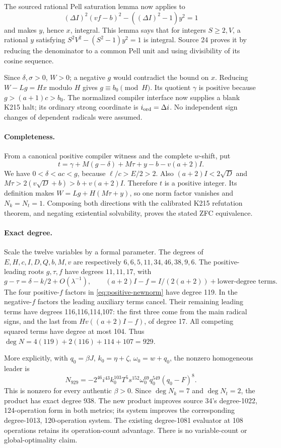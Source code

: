 The sourced rational Pell saturation lemma now applies to
\[
(\Delta I)^2(vf-b)^2-((\Delta I)^2-1)y^2=1
\]
and makes \(y\), hence \(x\), integral. This lemma says that for
integers \(S\ge2,V\), a rational \(y\) satisfying
\(S^2V^2-(S^2-1)y^2=1\) is integral. Source 24 proves it by reducing
the denominator to a common Pell unit and using divisibility of its
cosine sequence.

Since \(\delta,\sigma>0\), \(W>0\); a negative \(g\) would contradict
the bound on \(x\). Reducing \(W-Lg=Hx\) modulo \(H\) gives
\(g\equiv b_0\pmod H\). Its quotient \(\gamma\) is positive because
\(g>(a+1)c>b_0\). The normalized compiler interface now supplies a blank
K215 halt; its ordinary strong coordinate is \(i_{\rm ord}=\Delta i\).
No independent sign changes of dependent radicals were assumed.

\paragraph{Completeness.}
From a canonical positive compiler witness and the complete \(w\)-shift,
put
\[
t=\gamma+M(g-\delta)+M\tau+y-b-v(a+2)I.
\]
We have \(0<\delta<ac<g\), because \(\ell/c>E/2>2\).
Also \((a+2)I<2\sqrt D\) and
\(M\tau>2(v\sqrt D+b)>b+v(a+2)I\). Therefore \(t\) is a positive
integer. Its definition makes \(W=Lg+H(M\tau+y)\), so one norm factor
vanishes and \(N_k=N_t=1\). Composing both directions with the calibrated
K215 refutation theorem, and negating existential solvability, proves the
stated ZFC equivalence.

\paragraph{Exact degree.}
Scale the twelve variables by a formal parameter. The degrees of
\(E,H,c,I,D,Q,b,M,v\) are respectively
\(6,6,5,11,34,46,38,9,6\).
The positive-leading roots \(g,\tau,f\) have degrees \(11,11,17\), with
\[
g-\tau=\delta-k/2+O(\lambda^{-1}),\qquad
(a+2)I-f=I/(2(a+2))+\text{lower-degree terms}.
\]
The four positive-\(f\) factors in \eqref{eq:positive-newnorm} have degree
119. In the negative-\(f\) factors the leading auxiliary terms cancel.
Their remaining leading terms have degrees 116,116,114,107: the first
three come from the main radical signs, and the last from
\(Hv((a+2)I-f)\), of degree 17. All competing squared terms have degree
at most 104. Thus \(\deg N=4(119)+2(116)+114+107=929\).

More explicitly, with \(q_0=\beta J\), \(k_0=\eta+\zeta\),
\(\omega_0=w+q_0\), the nonzero homogeneous leader is
\[
N_{929}=-2^{46}i^{43}k_0^{103}T^5s^{152}
\omega_0^{69}q_0^{549}(q_0-F)^8.
\]
This is nonzero for every authentic \(\beta>0\). Since
\(\deg N_k=7\) and \(\deg N_t=2\), the product has exact degree 938.
The new product improves source 34's degree-1022, 124-operation form in
both metrics; its system improves the corresponding degree-1013,
120-operation system. The existing degree-1081 evaluator at 108 operations
retains its operation-count advantage. There is no variable-count or
global-optimality claim.

